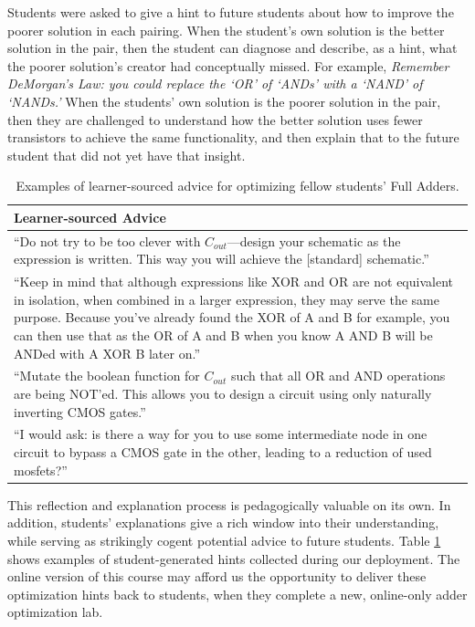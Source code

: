 \documentclass{sigchi}
\begin{document}
Students were asked to give a hint to future students about how to improve the poorer solution in each pairing. When the student's own solution is the better solution in the pair, then the student can diagnose and describe, as a hint, what the poorer solution's creator had conceptually missed. For example, {\it Remember DeMorgan's Law: you could replace the `OR' of `ANDs' with a `NAND' of `NANDs.'} When the students' own solution is the poorer solution in the pair, then they are challenged to understand how the better solution uses fewer transistors to achieve the same functionality, and then explain that to the future student that did not yet have that insight. 

\begin{table}
\begin{tabularx}{\columnwidth}{ |X| }
\hline
{\bf Learner-sourced Advice} \\
    \hline
    ``Do not try to be too clever with $C_{out}$---design your schematic as the expression is written. This way you will achieve the [standard] schematic.'' \\ \hline
    ``Keep in mind that although expressions like XOR and OR are not equivalent in isolation, when combined in a larger expression, they may serve the same purpose. Because you've already found the XOR of A and B for example, you can then use that as the OR of A and B when you know A AND B will be ANDed with A XOR B later on.'' \\ \hline
``Mutate the boolean function for $C_{out}$ such that all OR and AND operations are being NOT'ed. This allows you to design a circuit using only naturally inverting CMOS gates.'' \\ \hline 
``I would ask: is there a way for you to use some intermediate node in one circuit to bypass a CMOS gate in the other, leading to a reduction of used mosfets?'' \\ \hline
    \end{tabularx}
\caption{Examples of learner-sourced advice for optimizing fellow students' Full Adders.}
\label{tab}
\end{table}


This reflection and explanation process is pedagogically valuable on its own. In addition, students' explanations give a rich window into their understanding, while serving as strikingly cogent potential advice to future students. Table \ref{tab} shows examples of student-generated hints collected during our deployment. The online version of this course may afford us the opportunity to deliver these optimization hints back to students, when they complete a new, online-only adder optimization lab.
\end{document}
